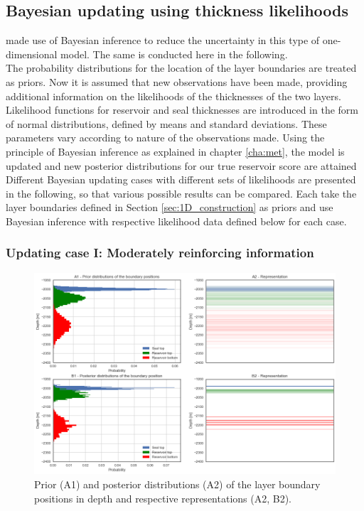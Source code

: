 			\subsection{Bayesian updating using thickness likelihoods}
			\citet{delaVarga2016} made use of Bayesian inference to reduce the uncertainty in this type of one-dimensional model. The same is conducted here in the following.\\				
			The probability distributions for the location of the layer boundaries are treated as priors. Now it is assumed that new observations have been made, providing additional information on the likelihoods of the thicknesses of the two layers. Likelihood functions for reservoir and seal thicknesses are introduced in the form of normal distributions, defined by means and standard deviations. These parameters vary according to nature of the observations made. Using the principle of Bayesian inference as explained in chapter \ref{cha:met}, the model is updated and new posterior distributions for our true reservoir score are attained\\
			Different Bayesian updating cases with different sets of likelihoods are presented in the following, so that various possible results can be compared. Each take the layer boundaries defined in Section \ref{sec:1D_construction} as priors and use Bayesian inference with respective likelihood data defined below for each case.
				
				\subsubsection{Updating case I: Moderately reinforcing information}
				\begin{figure}[h]
					\centering
					\includegraphics[width=1\textwidth]{Figures/update_moderate1.png}
					\caption{Prior (A1) and posterior distributions (A2) of the layer boundary positions in depth and respective representations (A2, B2).}\label{fig:update_moderate1} 
				\end{figure}
				
